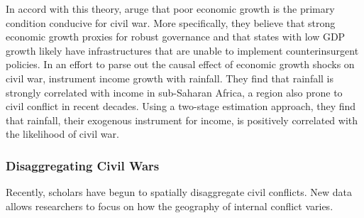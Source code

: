 In accord with this theory, \cite{fearon:laitin:2003} aruge that poor economic growth is the primary condition conducive for civil war.  More specifically, they believe that strong economic growth proxies for robust governance and that states with low GDP growth likely have infrastructures that are unable to implement counterinsurgent policies.  In an effort to parse out the causal effect of economic growth shocks on civil war, \cite{miguel:etal:2004} instrument income growth with rainfall.  They find that rainfall is strongly correlated with income in sub-Saharan Africa, a region also prone to civil conflict in recent decades.   Using a two-stage estimation approach, they find that rainfall, their exogenous instrument for income, is positively correlated with the likelihood of civil war.

\subsubsection{Disaggregating Civil Wars}

Recently, scholars have begun to spatially disaggregate civil conflicts.  New data allows researchers to focus on how the geography of internal conflict varies.  




